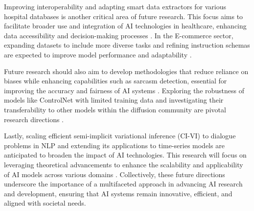 Improving interoperability and adapting smart data extractors for various hospital databases is another critical area of future research. This focus aims to facilitate broader use and integration of AI technologies in healthcare, enhancing data accessibility and decision-making processes \cite{quennelle2023smartdataextractorclinician}. In the E-commerce sector, expanding datasets to include more diverse tasks and refining instruction schemas are expected to improve model performance and adaptability \cite{li2023ecomgptinstructiontuninglargelanguage}.



Future research should also aim to develop methodologies that reduce reliance on biases while enhancing capabilities such as sarcasm detection, essential for improving the accuracy and fairness of AI systems \cite{nimase2024morecontextshelpsarcasm}. Exploring the robustness of models like ControlNet with limited training data and investigating their transferability to other models within the diffusion community are pivotal research directions \cite{zhang2023adding}.



Lastly, scaling efficient semi-implicit variational inference (CI-VI) to dialogue problems in NLP and extending its applications to time-series models are anticipated to broaden the impact of AI technologies. This research will focus on leveraging theoretical advancements to enhance the scalability and applicability of AI models across various domains \cite{moens2021efficientsemiimplicitvariationalinference}. Collectively, these future directions underscore the importance of a multifaceted approach in advancing AI research and development, ensuring that AI systems remain innovative, efficient, and aligned with societal needs.



